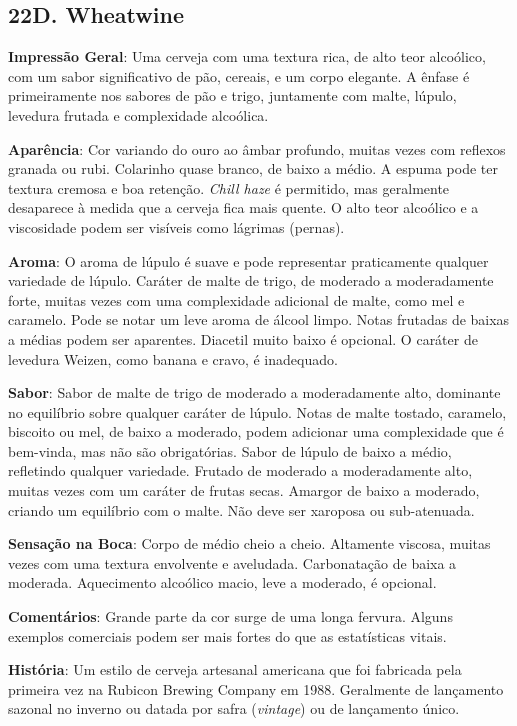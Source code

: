 \subsection*{22D. Wheatwine}
\textbf{Impressão Geral}: Uma cerveja com uma textura rica, de alto teor alcoólico, com um sabor significativo de pão, cereais, e um corpo elegante. A ênfase é primeiramente nos sabores de pão e trigo, juntamente com malte, lúpulo, levedura frutada e complexidade alcoólica.

\textbf{Aparência}: Cor variando do ouro ao âmbar profundo, muitas vezes com reflexos granada ou rubi. Colarinho quase branco, de baixo a médio. A espuma pode ter textura cremosa e boa retenção. \textit{Chill haze} é permitido, mas geralmente desaparece à medida que a cerveja fica mais quente. O alto teor alcoólico e a viscosidade podem ser visíveis como lágrimas (pernas).

\textbf{Aroma}: O aroma de lúpulo é suave e pode representar praticamente qualquer variedade de lúpulo. Caráter de malte de trigo, de moderado a moderadamente forte, muitas vezes com uma complexidade adicional de malte, como mel e caramelo. Pode se notar um leve aroma de álcool limpo. Notas frutadas de baixas a médias podem ser aparentes. Diacetil muito baixo é opcional. O caráter de levedura Weizen, como banana e cravo, é inadequado.

\textbf{Sabor}: Sabor de malte de trigo de moderado a moderadamente alto, dominante no equilíbrio sobre qualquer caráter de lúpulo. Notas de malte tostado, caramelo, biscoito ou mel, de baixo a moderado, podem adicionar uma complexidade que é bem-vinda, mas não são obrigatórias. Sabor de lúpulo de baixo a médio, refletindo qualquer variedade. Frutado de moderado a moderadamente alto, muitas vezes com um caráter de frutas secas. Amargor de baixo a moderado, criando um equilíbrio com o malte. Não deve ser xaroposa ou sub-atenuada.

\textbf{Sensação na Boca}: Corpo de médio cheio a cheio. Altamente viscosa, muitas vezes com uma textura envolvente e aveludada. Carbonatação de baixa a moderada. Aquecimento alcoólico macio, leve a moderado, é opcional.

\textbf{Comentários}: Grande parte da cor surge de uma longa fervura. Alguns exemplos comerciais podem ser mais fortes do que as estatísticas vitais.

\textbf{História}: Um estilo de cerveja artesanal americana que foi fabricada pela primeira vez na Rubicon Brewing Company em 1988. Geralmente de lançamento sazonal no inverno ou datada por safra (\textit{vintage}) ou de lançamento único.


